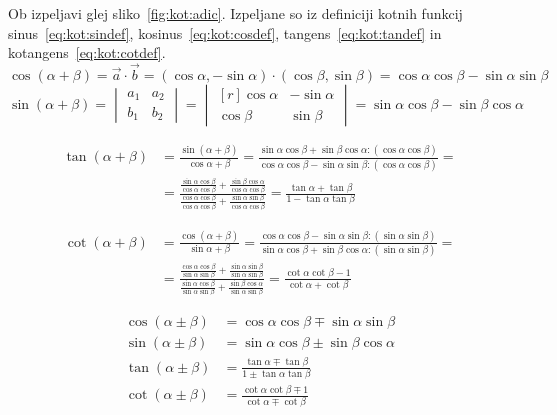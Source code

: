 \documentclass[a4paper,oneside,12pt,fleqn]{article}
\newcommand\krat\cdot
\def\kos{\cos}
\numberwithin{equation}{section}
\begin{document}
Ob izpeljavi glej sliko~\ref{fig:kot:adic}. Izpeljane so iz definiciji kotnih funkcij
sinus~\eqref{eq:kot:sindef}, kosinus~\eqref{eq:kot:cosdef}, tangens~\eqref{eq:kot:tandef} in
kotangens~\eqref{eq:kot:cotdef}.
\[\kos(\alpha+\beta) = \vec{a}\krat\vec{b} = (\kos\alpha, -\sin\alpha)\krat(\kos\beta,
\sin\beta) = \kos\alpha\kos\beta - \sin\alpha\sin\beta \]
\[\sin(\alpha+\beta) = \begin{vmatrix} a_1 & a_2 \\ b_1 & b_2 \end{vmatrix} = 
  \begin{vmatrix*}[r] \kos\alpha & -\sin\alpha \\ \kos\beta & \sin\beta \end{vmatrix*} =
  \sin\alpha\kos\beta - \sin\beta\kos\alpha \]

\begin{align*} \tan(\alpha+\beta) &= \frac{\sin(\alpha+\beta)}{\kos\alpha+\beta} =
\frac{\sin\alpha\kos\beta+\sin\beta\kos\alpha :(\kos\alpha\kos\beta)}{\kos\alpha\kos\beta
- \sin\alpha\sin\beta :(\kos\alpha\kos\beta)} =\\&=
\frac{\frac{\sin\alpha\kos\beta}{\kos\alpha\kos\beta}+\frac{\sin\beta\kos\alpha}{\kos\alpha\kos\beta}}
{\frac{\kos\alpha\kos\beta}{\kos\alpha\kos\beta}+\frac{\sin\alpha\sin\beta}{\kos\alpha\kos\beta}}
= \frac{\tan\alpha+\tan\beta}{1-\tan\alpha\tan\beta} \end{align*}

\begin{align*} \cot(\alpha+\beta) &= \frac{\kos(\alpha+\beta)}{\sin\alpha+\beta} =
\frac{\kos\alpha\kos\beta-\sin\alpha\sin\beta :(\sin\alpha\sin\beta)}{\sin\alpha\kos\beta
+ \sin\beta\kos\alpha :(\sin\alpha\sin\beta)} =\\&=
\frac{\frac{\kos\alpha\kos\beta}{\sin\alpha\sin\beta}+\frac{\sin\alpha\sin\beta}{\sin\alpha\sin\beta}}
{\frac{\sin\alpha\kos\beta}{\sin\alpha\sin\beta}+\frac{\sin\beta\kos\alpha}{\sin\alpha\sin\beta}}
= \frac{\cot\alpha\cot\beta-1}{\cot\alpha+\cot\beta} \end{align*}

\boldmath
\begin{align}
  \kos(\alpha\pm\beta) &= \kos\alpha\kos\beta \mp \sin\alpha\sin\beta \label{eq:kot:adic:cos} \\
  \sin(\alpha\pm\beta) &= \sin\alpha\kos\beta \pm \sin\beta\kos\alpha \label{eq:kot:adic:sin} \\
  \tan(\alpha\pm\beta) &= \frac{\tan\alpha \mp \tan\beta}{1 \pm \tan\alpha\tan\beta} \label{eq:kot:adic:tan} \\
  \cot(\alpha\pm\beta) &= \frac{\cot\alpha\cot\beta \mp 1}{\cot\alpha \mp \cot\beta} \label{eq:kot:adic:cot}
\end{align}
\unboldmath
\end{document}
